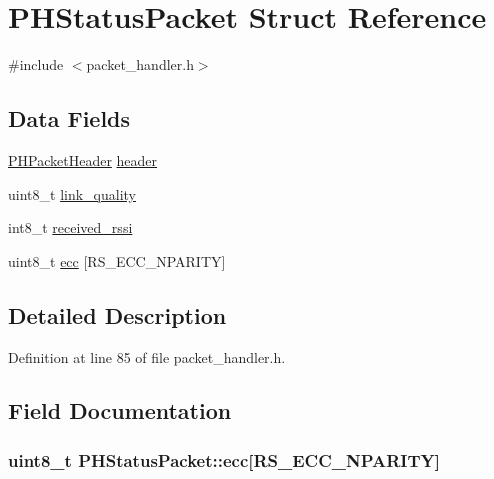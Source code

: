 \hypertarget{struct_p_h_status_packet}{\section{\-P\-H\-Status\-Packet \-Struct \-Reference}
\label{struct_p_h_status_packet}
}


{\ttfamily \#include $<$packet\-\_\-handler.\-h$>$}

\subsection*{\-Data \-Fields}
\begin{DoxyCompactItemize}
\item 
\hyperlink{struct_p_h_packet_header}{\-P\-H\-Packet\-Header} \hyperlink{struct_p_h_status_packet_a01617aa2bca7a093aa2dd7a2e7edc47a}{header}
\item 
uint8\-\_\-t \hyperlink{struct_p_h_status_packet_ac78a8f872dbb6ece46016b5fdc901037}{link\-\_\-quality}
\item 
int8\-\_\-t \hyperlink{struct_p_h_status_packet_a8dcb964e68ef8dbed6c28e6418dc3e2e}{received\-\_\-rssi}
\item 
uint8\-\_\-t \hyperlink{struct_p_h_status_packet_a6ae4779221b82cd043d0798111010d42}{ecc} \mbox{[}\-R\-S\-\_\-\-E\-C\-C\-\_\-\-N\-P\-A\-R\-I\-T\-Y\mbox{]}
\end{DoxyCompactItemize}


\subsection{\-Detailed \-Description}


\-Definition at line 85 of file packet\-\_\-handler.\-h.



\subsection{\-Field \-Documentation}
\hypertarget{struct_p_h_status_packet_a6ae4779221b82cd043d0798111010d42}{
\subsubsection[{ecc}]{\setlength{\rightskip}{0pt plus 5cm}uint8\-\_\-t {\bf \-P\-H\-Status\-Packet\-::ecc}\mbox{[}\-R\-S\-\_\-\-E\-C\-C\-\_\-\-N\-P\-A\-R\-I\-T\-Y\mbox{]}}}\label{struct_p_h_status_packet_a6ae4779221b82cd043d0798111010d42}


